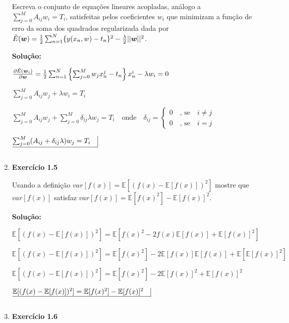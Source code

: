\begin{enumerate}
Escreva o conjunto de equações lineares acopladas, análogo a $\sum_{j=0}^{M}A_{ij} w_i = T_i$, satisfeitas pelos coeficientes $w_i$ que minimizam a função de erro da soma dos quadrados regularizada dada por $\Tilde{E}(\boldsymbol{w})=\frac{1}{2}\sum_{n=1}^{N} \{y(x_n,w)-t_n\}^2 - \frac{\lambda}{2}||\boldsymbol{w}||^2$.
\newline \par
\textbf{Solução:}


$ \frac{\partial \Tilde{E}(\boldsymbol{w}_i)}{\partial \boldsymbol{w}}=\frac{1}{2}\sum_{n=1}^{N} \left\{ \sum_{j=0}^{M} w_j x_n^j -t_n 
\right\} x_n^i    - \lambda w_i = 0$

$  \sum_{j=0}^{M}A_{ij} w_j + \lambda w_i = T_i $

$  \sum_{j=0}^{M}A_{ij} w_j + \sum_{j=0}^{M} \delta_{ij} \lambda w_j = T_i \quad \text{onde} \quad  \delta_{ij} = \begin{cases}
0 \quad \text{, se} \quad i \neq j \\
0 \quad \text{, se} \quad i = j
\end{cases}$

$\underline{\sum_{j=0}^{M}(A_{ij} + \delta_{ij} \lambda)w_j = T_i\quad} \vline $

$ $

\item \textbf{Exercício 1.5} \par

Usando a definição $var[f(x)]=\mathbb{E}[(f(x)-\mathbb{E}[f(x)])^2]$ mostre que $var[f(x)]$ satisfaz $var[f(x)]=\mathbb{E}[f(x)^2]-\mathbb{E}[f(x)]^2$.
\newline \par
\textbf{Solução:}


$\mathbb{E}[(f(x)-\mathbb{E}[f(x)])^2] = \mathbb{E}[f(x)^2-2f(x)\mathbb{E}[f(x)]+\mathbb{E}[f(x)]^2]$

$\mathbb{E}[(f(x)-\mathbb{E}[f(x)])^2] = \mathbb{E}[f(x)^2]-2\mathbb{E}[f(x)]\mathbb{E}[f(x)]+\mathbb{E}[\mathbb{E}[f(x)]^2]$

$\mathbb{E}[(f(x)-\mathbb{E}[f(x)])^2] = \mathbb{E}[f(x)^2]-2\mathbb{E}[f(x)]^2+\mathbb{E}[f(x)]^2$

$\underline{\mathbb{E}[(f(x)-\mathbb{E}[f(x)])^2] = \mathbb{E}[f(x)^2]-\mathbb{E}[f(x)]^2\quad} \vline$

$ $



\item \textbf{Exercício 1.6} \par


\end{enumerate}
